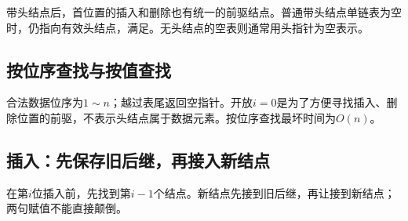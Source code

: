 \hypertarget{ds2-head-benefit}{}

带头结点后，首位置的插入和删除也有统一的前驱结点。普通带头结点单链表为空时，仍指向有效头结点，满足。无头结点的空表则通常用头指针为空表示。


\hypertarget{ds2-linked-find}{}

\subsection{按位序查找与按值查找}\label{ds2-linked-find}

\hypertarget{ds2-getelem}{}

\Needspace{115.2pt}

\hypertarget{ds2-getelem-note}{}

合法数据位序为$1\sim n$；越过表尾返回空指针。开放$i=0$是为了方便寻找插入、删除位置的前驱，不表示头结点属于数据元素。按位序查找最坏时间为$O(n)$。


\hypertarget{ds2-linked-locate}{}

\Needspace{105.6pt}

\hypertarget{ds2-linked-insert}{}

\subsection{插入：先保存旧后继，再接入新结点}\label{ds2-linked-insert}

\hypertarget{ds2-linked-insert-idea}{}

在第$i$位插入前，先找到第$i-1$个结点。新结点先接到旧后继，再让接到新结点；两句赋值不能直接颠倒。


\hypertarget{ds2-link-insert-figure}{}


\hypertarget{ds2-linked-insert-code}{}

\Needspace{124.8pt}

\hypertarget{ds2-linked-allocation}{}


